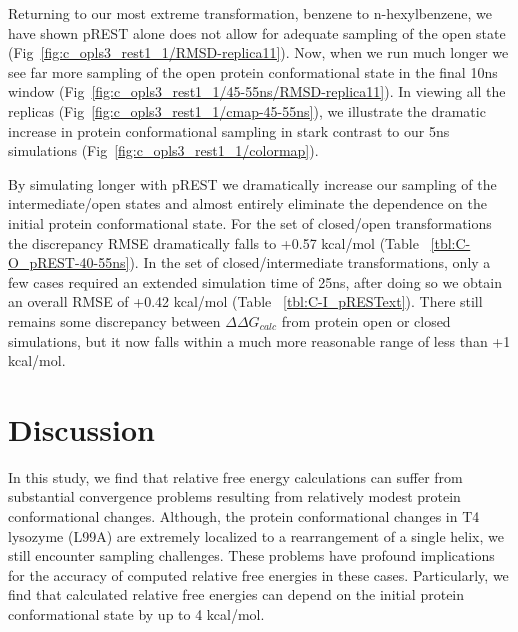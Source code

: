\documentclass[journal=jctcce,manuscript=article]{achemso}
\begin{document}
Returning to our most extreme transformation, benzene to n-hexylbenzene, we have shown pREST alone does not allow for adequate sampling of the open state (Fig~\ref{fig:c_opls3_rest1_1/RMSD-replica11}).
Now, when we run much longer we see far more sampling of the open protein conformational state in the final 10ns window (Fig~\ref{fig:c_opls3_rest1_1/45-55ns/RMSD-replica11}).
In viewing all the replicas (Fig~\ref{fig:c_opls3_rest1_1/cmap-45-55ns}), we illustrate the dramatic increase in protein conformational sampling in stark contrast to our 5ns simulations (Fig~\ref{fig:c_opls3_rest1_1/colormap}). 

By simulating longer with pREST we dramatically increase our sampling of the intermediate/open states and almost entirely eliminate the dependence on the initial protein conformational state.
For the set of closed/open transformations the discrepancy RMSE dramatically falls to +0.57 kcal/mol (Table ~\ref{tbl:C-O_pREST-40-55ns}).
In the set of closed/intermediate transformations, only a few cases required an extended simulation time of 25ns, after doing so we obtain an overall RMSE of +0.42 kcal/mol (Table ~\ref{tbl:C-I_pRESText}). 
There still remains some discrepancy between $\Delta\Delta G_{calc}$ from protein open or closed simulations, but it now falls within a much more reasonable range of less than +1 kcal/mol. 
 
\section{Discussion}

In this study, we find that relative free energy calculations can suffer from substantial convergence problems resulting from relatively modest protein conformational changes.
Although, the protein conformational changes in T4 lysozyme (L99A) are extremely localized to a rearrangement of a single helix, we still encounter sampling challenges.
These problems have profound implications for the accuracy of computed relative free energies in these cases.
Particularly, we find that calculated relative free energies can depend on the initial protein conformational state by up to 4 kcal/mol.
\end{document}
